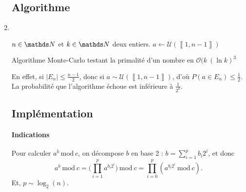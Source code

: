 \begin{enumerate}
		\subsection{Algorithme}
	\item~
		\begin{algorithm}[H]
			\centering
			\begin{algorithmic}[1]
				\Entree $n \in \N$\/ et $k \in \N$\/ deux entiers.
				\State $a \gets \mathcal{U}(\left\llbracket 1,n-1 \right\rrbracket)$
				\State{}\/ 
				\EndIf
				\EndFor
				\State{}\/
			\end{algorithmic}
			\caption{Algorithme {\sc Monte-Carlo}\/ testant la primalité d'un nombre en $\mathcal{O}(k\:(\ln k)^3$}
		\end{algorithm}

		En effet, si $|E_n| \le \frac{n-1}{2}$, donc si $a \sim \mathcal{U}(\left\llbracket 1,n-1 \right\rrbracket)$, d'où $P(a \in E_n) \le \frac{1}{2}$.
		La probabilité que l'algorithme échoue est inférieure à $\frac{1}{2^k}$.

		\subsection{Implémentation}

		\paragraph{Indications}
		Pour calculer $a^b\ \mathrm{mod}\ c$, on décompose $b$\/ en base 2 : $b = \sum_{i=1}^p b_i 2^i$, et donc
		\[
			a^b\ \mathrm{mod}\ c = \Big(\prod_{i=1}^p a^{b_i 2^i}\Big)\ \mathrm{mod}\ c = \prod_{i=0}^p \left( a^{b_i 2^i}\ \mathrm{mod}\ c \right).
		\] Et, $p \sim \log_2(n)$.
\end{enumerate}
